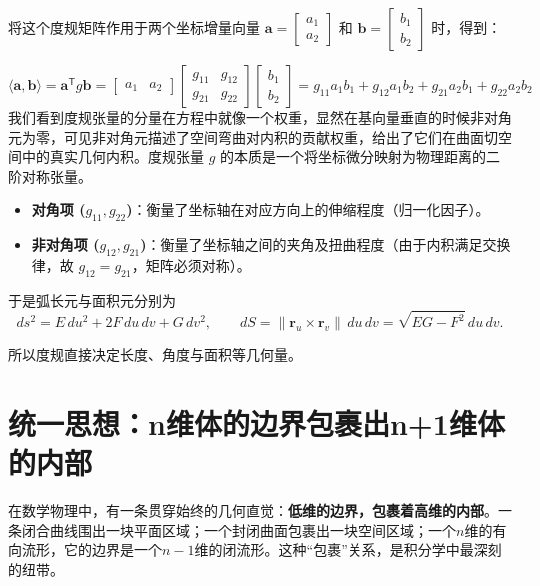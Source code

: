 \documentclass[UTF8]{ctexbook}
\begin{document}
将这个度规矩阵作用于两个坐标增量向量 $\mathbf{a} = \begin{bmatrix} a_1 \\ a_2 \end{bmatrix}$ 和 $\mathbf{b} = \begin{bmatrix} b_1 \\ b_2 \end{bmatrix}$ 时，得到：

\[
    \langle \mathbf{a}, \mathbf{b} \rangle = \mathbf{a}^{\mathsf{T}} g \mathbf{b} = 
    \begin{bmatrix} a_1 & a_2 \end{bmatrix} 
    \begin{bmatrix} g_{11} & g_{12} \\ g_{21} & g_{22} \end{bmatrix} 
    \begin{bmatrix} b_1 \\ b_2 \end{bmatrix}
    = g_{11}a_1b_1 + g_{12}a_1b_2 + g_{21}a_2b_1 + g_{22}a_2b_2
\]
我们看到度规张量的分量在方程中就像一个权重，显然在基向量垂直的时候非对角元为零，可见非对角元描述了空间弯曲对内积的贡献权重，给出了它们在曲面切空间中的真实几何内积。度规张量 $g$ 的本质是一个将坐标微分映射为物理距离的二阶对称张量。
\begin{itemize}
    \item \textbf{对角项 ($g_{11}, g_{22}$)}：衡量了坐标轴在对应方向上的伸缩程度（归一化因子）。
    \item \textbf{非对角项 ($g_{12}, g_{21}$)}：衡量了坐标轴之间的夹角及扭曲程度（由于内积满足交换律，故 $g_{12} = g_{21}$，矩阵必须对称）。
\end{itemize}

于是弧长元与面积元分别为
\[
ds^2=E\,du^2+2F\,du\,dv+G\,dv^2,
\qquad
dS=\|\mathbf{r}_u\times\mathbf{r}_v\|\,du\,dv=\sqrt{EG-F^2}\,du\,dv.
\]

所以度规直接决定长度、角度与面积等几何量。

\newpage

\section{统一思想：n维体的边界包裹出n+1维体的内部}

在数学物理中，有一条贯穿始终的几何直觉：\textbf{低维的边界，包裹着高维的内部}。一条闭合曲线围出一块平面区域；一个封闭曲面包裹出一块空间区域；一个$n$维的有向流形，它的边界是一个$n-1$维的闭流形。这种“包裹”关系，是积分学中最深刻的纽带。
\end{document}
